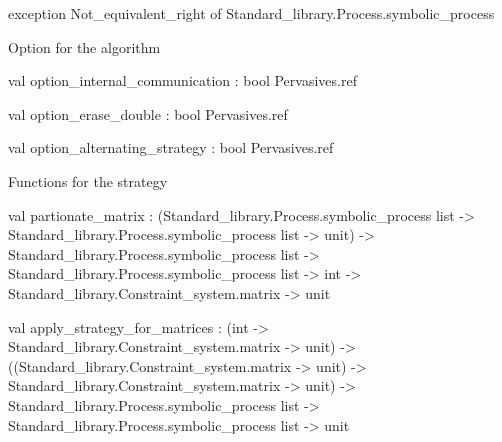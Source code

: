\label{exception:Algorithm.Not-underscoreequivalent-underscoreright}\begin{ocamldoccode}
exception Not_equivalent_right of Standard_library.Process.symbolic_process
\end{ocamldoccode}




Option for the algorithm



\label{val:Algorithm.option-underscoreinternal-underscorecommunication}\begin{ocamldoccode}
val option_internal_communication : bool Pervasives.ref
\end{ocamldoccode}




\label{val:Algorithm.option-underscoreerase-underscoredouble}\begin{ocamldoccode}
val option_erase_double : bool Pervasives.ref
\end{ocamldoccode}




\label{val:Algorithm.option-underscorealternating-underscorestrategy}\begin{ocamldoccode}
val option_alternating_strategy : bool Pervasives.ref
\end{ocamldoccode}




Functions for the strategy



\label{val:Algorithm.partionate-underscorematrix}\begin{ocamldoccode}
val partionate_matrix :
  (Standard_library.Process.symbolic_process list ->
   Standard_library.Process.symbolic_process list -> unit) ->
  Standard_library.Process.symbolic_process list ->
  Standard_library.Process.symbolic_process list ->
  int -> Standard_library.Constraint_system.matrix -> unit
\end{ocamldoccode}




\label{val:Algorithm.apply-underscorestrategy-underscorefor-underscorematrices}\begin{ocamldoccode}
val apply_strategy_for_matrices :
  (int -> Standard_library.Constraint_system.matrix -> unit) ->
  ((Standard_library.Constraint_system.matrix -> unit) ->
   Standard_library.Constraint_system.matrix -> unit) ->
  Standard_library.Process.symbolic_process list ->
  Standard_library.Process.symbolic_process list -> unit
\end{ocamldoccode}




